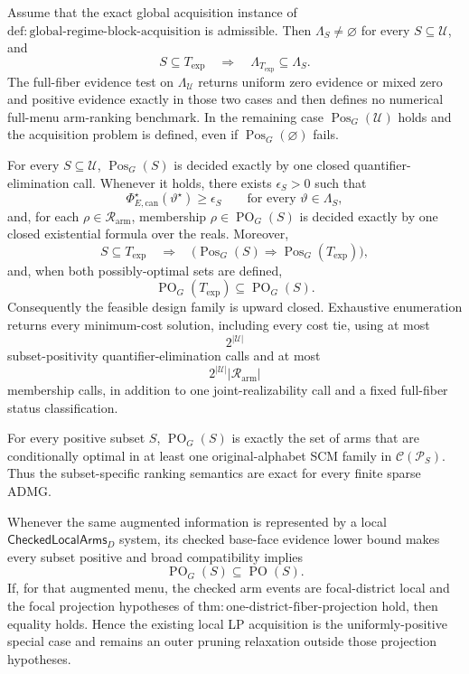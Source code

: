 Assume that the exact global acquisition instance of \(\mathrm{def:global\text{-}regime\text{-}block\text{-}acquisition}\) is admissible.  Then \(\Lambda_S\ne\varnothing\) for every \(S\subseteq\mathcal U\), and
\[
S\subseteq T_{\mathrm{exp}}
\quad\Longrightarrow\quad
\Lambda_{T_{\mathrm{exp}}}\subseteq\Lambda_S.
\]
The full-fiber evidence test on \(\Lambda_{\mathcal U}\) returns uniform zero evidence or mixed zero and positive evidence exactly in those two cases and then defines no numerical full-menu arm-ranking benchmark.  In the remaining case \(\operatorname{Pos}_G(\mathcal U)\) holds and the acquisition problem is defined, even if \(\operatorname{Pos}_G(\varnothing)\) fails.

For every \(S\subseteq\mathcal U\), \(\operatorname{Pos}_G(S)\) is decided exactly by one closed quantifier-elimination call.  Whenever it holds, there exists \(\epsilon_S>0\) such that
\[
\Phi_{E,\mathrm{can}}^\star(\vartheta^\star)\geq\epsilon_S
\qquad\text{for every }\vartheta\in\Lambda_S,
\]
and, for each \(\rho\in\mathcal R_{\mathrm{arm}}\), membership \(\rho\in\operatorname{PO}_G(S)\) is decided exactly by one closed existential formula over the reals.  Moreover,
\[
S\subseteq T_{\mathrm{exp}}
\quad\Longrightarrow\quad
\bigl(\operatorname{Pos}_G(S)\Longrightarrow
\operatorname{Pos}_G(T_{\mathrm{exp}})\bigr),
\]
and, when both possibly-optimal sets are defined,
\[
\operatorname{PO}_G(T_{\mathrm{exp}})
\subseteq\operatorname{PO}_G(S).
\]
Consequently the feasible design family is upward closed.  Exhaustive enumeration returns every minimum-cost solution, including every cost tie, using at most
\[
2^{|\mathcal U|}
\]
subset-positivity quantifier-elimination calls and at most
\[
2^{|\mathcal U|}|\mathcal R_{\mathrm{arm}}|
\]
membership calls, in addition to one joint-realizability call and a fixed full-fiber status classification.

For every positive subset \(S\), \(\operatorname{PO}_G(S)\) is exactly the set of arms that are conditionally optimal in at least one original-alphabet SCM family in \(\mathcal C(\mathcal P_S)\).  Thus the subset-specific ranking semantics are exact for every finite sparse ADMG.

Whenever the same augmented information is represented by a local \(\mathsf{CheckedLocalArms}_D\) system, its checked base-face evidence lower bound makes every subset positive and broad compatibility implies
\[
\operatorname{PO}_G(S)\subseteq\operatorname{PO}(S).
\]
If, for that augmented menu, the checked arm events are focal-district local and the focal projection hypotheses of \(\mathrm{thm:one\text{-}district\text{-}fiber\text{-}projection}\) hold, then equality holds.  Hence the existing local LP acquisition is the uniformly-positive special case and remains an outer pruning relaxation outside those projection hypotheses.

